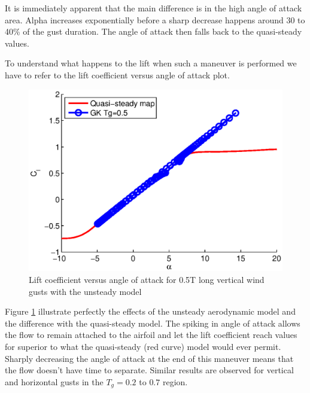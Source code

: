 \par It is immediately apparent that the main difference is in the high angle of attack area.
Alpha increases exponentially before a sharp decrease happens around 30 to 40\% of the gust duration.
The angle of attack then falls back to the quasi-steady values.

\FloatBarrier

\par To understand what happens to the lift when such a maneuver is performed we have to refer to the lift coefficient versus angle of attack plot.

\begin{figure}[h]
  \centering
  \includegraphics{./Figures/Cl_vs_alpha_wt=1_tg=0p5_alphamax=20.eps}
  \caption{Lift coefficient versus angle of attack for 0.5T long vertical wind gusts with the unsteady model}
  \label{fig:Cl_vs_alpha_short_gust_unsteady}
\end{figure}
\FloatBarrier

\par Figure \ref{fig:Cl_vs_alpha_short_gust_unsteady} illustrate perfectly the effects of the unsteady aerodynamic model and the difference with the quasi-steady model.
The spiking in angle of attack allows the flow to remain attached to the airfoil and let the lift coefficient reach values for superior to what the quasi-steady (red curve) model would ever permit.
Sharply decreasing the angle of attack at the end of this maneuver means that the flow doesn't have time to separate.
Similar results are observed for vertical and horizontal gusts in the $T_g=0.2$ to $0.7$ region.



